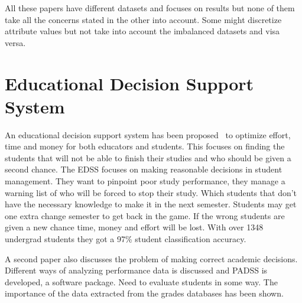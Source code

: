\bigskip\noindent
All these papers have different datasets and focuses on results but none of them take all the concerns stated in the other into account. 
Some might discretize attribute values but not take into account the imbalanced datasets and visa versa.

\section{Educational Decision Support System}
An educational decision support system has been proposed~\cite{5} to optimize effort, time and money for both educators and students. 
This focuses on finding the students that will not be able to finish their studies and who should be given a second chance. 
The EDSS focuses on making reasonable decisions in student management. 
They want to pinpoint poor study performance, they manage a warning list of who will be forced to stop their study. 
Which students that don't have the necessary knowledge to make it in the next semester. 
Students may get one extra change semester to get back in the game. 
If the wrong students are given a new chance time, money and effort will be lost. 
With over 1348 undergrad students they got a 97\% student classification accuracy.

\bigskip\noindent
A second paper also discusses the problem of making correct academic decisions.~\cite{6} 
Different ways of analyzing performance data is discussed and PADSS is developed, a software package. 
Need to evaluate students in some way. The importance of the data extracted from the grades databases has been shown. 